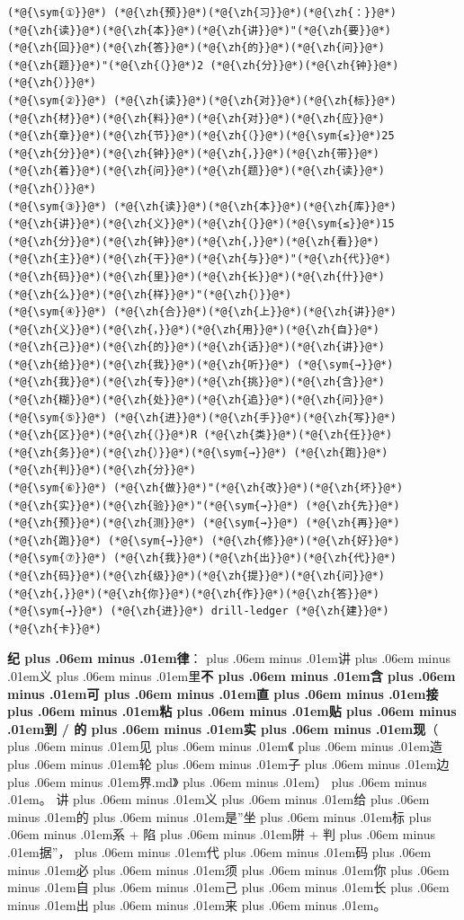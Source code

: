 \documentclass[
]{article}
\newcommand{\passthrough}[1]{#1}
\def\zh#1{{\zhfont #1}}
\def\sym#1{{\symfont #1}}
\def\codezh#1{{\zhmonofont #1}}
\def\zhglue{\hskip0pt plus .06em minus .01em}
\begin{document}
\begin{lstlisting}
(*@{\sym{①}}@*) (*@{\zh{预}}@*)(*@{\zh{习}}@*)(*@{\zh{：}}@*)(*@{\zh{读}}@*)(*@{\zh{本}}@*)(*@{\zh{讲}}@*)"(*@{\zh{要}}@*)(*@{\zh{回}}@*)(*@{\zh{答}}@*)(*@{\zh{的}}@*)(*@{\zh{问}}@*)(*@{\zh{题}}@*)"(*@{\zh{（}}@*)2 (*@{\zh{分}}@*)(*@{\zh{钟}}@*)(*@{\zh{）}}@*)
(*@{\sym{②}}@*) (*@{\zh{读}}@*)(*@{\zh{对}}@*)(*@{\zh{标}}@*)(*@{\zh{材}}@*)(*@{\zh{料}}@*)(*@{\zh{对}}@*)(*@{\zh{应}}@*)(*@{\zh{章}}@*)(*@{\zh{节}}@*)(*@{\zh{（}}@*)(*@{\sym{≤}}@*)25 (*@{\zh{分}}@*)(*@{\zh{钟}}@*)(*@{\zh{，}}@*)(*@{\zh{带}}@*)(*@{\zh{着}}@*)(*@{\zh{问}}@*)(*@{\zh{题}}@*)(*@{\zh{读}}@*)(*@{\zh{）}}@*)
(*@{\sym{③}}@*) (*@{\zh{读}}@*)(*@{\zh{本}}@*)(*@{\zh{库}}@*)(*@{\zh{讲}}@*)(*@{\zh{义}}@*)(*@{\zh{（}}@*)(*@{\sym{≤}}@*)15 (*@{\zh{分}}@*)(*@{\zh{钟}}@*)(*@{\zh{，}}@*)(*@{\zh{看}}@*)(*@{\zh{主}}@*)(*@{\zh{干}}@*)(*@{\zh{与}}@*)"(*@{\zh{代}}@*)(*@{\zh{码}}@*)(*@{\zh{里}}@*)(*@{\zh{长}}@*)(*@{\zh{什}}@*)(*@{\zh{么}}@*)(*@{\zh{样}}@*)"(*@{\zh{）}}@*)
(*@{\sym{④}}@*) (*@{\zh{合}}@*)(*@{\zh{上}}@*)(*@{\zh{讲}}@*)(*@{\zh{义}}@*)(*@{\zh{，}}@*)(*@{\zh{用}}@*)(*@{\zh{自}}@*)(*@{\zh{己}}@*)(*@{\zh{的}}@*)(*@{\zh{话}}@*)(*@{\zh{讲}}@*)(*@{\zh{给}}@*)(*@{\zh{我}}@*)(*@{\zh{听}}@*) (*@{\sym{→}}@*) (*@{\zh{我}}@*)(*@{\zh{专}}@*)(*@{\zh{挑}}@*)(*@{\zh{含}}@*)(*@{\zh{糊}}@*)(*@{\zh{处}}@*)(*@{\zh{追}}@*)(*@{\zh{问}}@*)
(*@{\sym{⑤}}@*) (*@{\zh{进}}@*)(*@{\zh{手}}@*)(*@{\zh{写}}@*)(*@{\zh{区}}@*)(*@{\zh{（}}@*)R (*@{\zh{类}}@*)(*@{\zh{任}}@*)(*@{\zh{务}}@*)(*@{\zh{）}}@*)(*@{\sym{→}}@*) (*@{\zh{跑}}@*)(*@{\zh{判}}@*)(*@{\zh{分}}@*)
(*@{\sym{⑥}}@*) (*@{\zh{做}}@*)"(*@{\zh{改}}@*)(*@{\zh{坏}}@*)(*@{\zh{实}}@*)(*@{\zh{验}}@*)"(*@{\sym{→}}@*) (*@{\zh{先}}@*)(*@{\zh{预}}@*)(*@{\zh{测}}@*) (*@{\sym{→}}@*) (*@{\zh{再}}@*)(*@{\zh{跑}}@*) (*@{\sym{→}}@*) (*@{\zh{修}}@*)(*@{\zh{好}}@*)
(*@{\sym{⑦}}@*) (*@{\zh{我}}@*)(*@{\zh{出}}@*)(*@{\zh{代}}@*)(*@{\zh{码}}@*)(*@{\zh{级}}@*)(*@{\zh{提}}@*)(*@{\zh{问}}@*)(*@{\zh{，}}@*)(*@{\zh{你}}@*)(*@{\zh{作}}@*)(*@{\zh{答}}@*) (*@{\sym{→}}@*) (*@{\zh{进}}@*) drill-ledger (*@{\zh{建}}@*)(*@{\zh{卡}}@*)
\end{lstlisting}

\textbf{\zh{纪\zhglue 律}}\zh{：\zhglue 讲\zhglue 义\zhglue 里}\textbf{\zh{不\zhglue 含\zhglue 可\zhglue 直\zhglue 接\zhglue 粘\zhglue 贴\zhglue 到} \passthrough{\codezh{{\zh{手}}{\zh{写}}/}} \zh{的\zhglue 实\zhglue 现}}\zh{（\zhglue 见\zhglue 《\zhglue 造\zhglue 轮\zhglue 子\zhglue 边\zhglue 界}.md\zh{》\zhglue ）\zhglue 。} \zh{讲\zhglue 义\zhglue 给\zhglue 的\zhglue 是}''\zh{坐\zhglue 标\zhglue 系} + \zh{陷\zhglue 阱} + \zh{判\zhglue 据}''\zh{，\zhglue 代\zhglue 码\zhglue 必\zhglue 须\zhglue 你\zhglue 自\zhglue 己\zhglue 长\zhglue 出\zhglue 来\zhglue 。}
\end{document}
